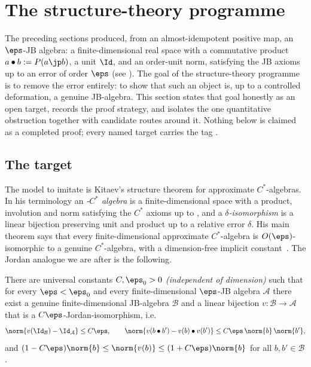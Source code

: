 \section{The structure-theory programme}\label{sec:programme}

The preceding sections produced, from an almost-idempotent positive map, an
$\eps$-JB algebra: a finite-dimensional real space with a commutative product
$a\bullet b := P(a\jp b)$, a unit $\Id$, and an order-unit norm, satisfying the
JB axioms up to an error of order $\eps$ (see ). The goal of the
structure-theory programme is to remove the error entirely: to show that such an
object is, up to a controlled deformation, a genuine JB-algebra. This section
states that goal honestly as an open target, records the proof strategy, and
isolates the one quantitative obstruction together with candidate routes around
it.
Nothing below is claimed as a completed proof; every named target carries the
tag .

\subsection{The target}

The model to imitate is Kitaev's structure theorem for approximate
$C^{*}$-algebras. In his terminology an \emph{\eps-$C^{*}$ algebra} is a
finite-dimensional space with a product, involution and norm satisfying the
$C^{*}$ axioms up to \eps, and a \emph{$\delta$-isomorphism} is a linear
bijection preserving unit and product up to a relative error $\delta$. His main
theorem says that every finite-dimensional approximate $C^{*}$-algebra is
$O(\eps)$-isomorphic to a genuine $C^{*}$-algebra, with a dimension-free implicit
constant~\cite[Theorem \texttt{th\_main}]{Kitaev2024}. The Jordan analogue we are
after is the following.

\begin{openproblem}\label{thm:jordan-structure}
There are universal constants $C,\eps_{0}>0$ \emph{(independent of dimension)}
such that for every $\eps<\eps_{0}$ and every finite-dimensional $\eps$-JB algebra
$\mathcal{A}$ there exist a genuine finite-dimensional JB-algebra $\mathcal{B}$
and a linear bijection $v\colon\mathcal{B}\to\mathcal{A}$ that is a
$C\eps$-Jordan-isomorphism, i.e.
\[
   \norm{v(\Id_{\mathcal{B}})-\Id_{\mathcal{A}}}\le C\eps,\qquad
   \norm{v(b\bullet b')-v(b)\bullet v(b')}\le C\eps\,\norm{b}\,\norm{b'},
\]
and $(1-C\eps)\norm{b}\le\norm{v(b)}\le(1+C\eps)\norm{b}$ for all
$b,b'\in\mathcal{B}$.
\end{openproblem}

